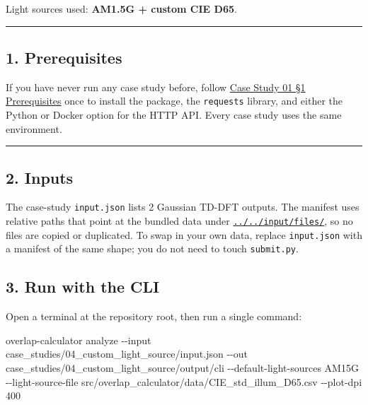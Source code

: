 \documentclass[
  11pt,
]{article}
\newenvironment{Shaded}{}{}
\newcommand{\AttributeTok}[1]{\textcolor[rgb]{0.49,0.56,0.16}{#1}}
\newcommand{\ExtensionTok}[1]{#1}
\newcommand{\NormalTok}[1]{#1}
\begin{document}
Light sources used: \textbf{AM1.5G + custom CIE D65}.

\begin{center}\rule{0.5\linewidth}{0.5pt}\end{center}

\hypertarget{1-prerequisites}{
\subsection{1. Prerequisites}\label{1-prerequisites}}

If you have never run any case study before, follow
\href{https://github.com/pinarsyt/overlap-calculator/blob/main/case_studies/01_theoretical_only/README.md\#1-prerequisites}{Case
Study 01 §1 Prerequisites} once to install the package, the
\texttt{requests} library, and either the Python or Docker option for
the HTTP API. Every case study uses the same environment.

\begin{center}\rule{0.5\linewidth}{0.5pt}\end{center}

\hypertarget{2-inputs}{
\subsection{2. Inputs}\label{2-inputs}}

The case-study \texttt{input.json} lists 2 Gaussian TD-DFT outputs. The
manifest uses relative paths that point at the bundled data under
\href{https://github.com/pinarsyt/overlap-calculator/blob/main/input/files}{\texttt{../../input/files/}},
so no files are copied or duplicated. To swap in your own data, replace
\texttt{input.json} with a manifest of the same shape; you do not need
to touch \texttt{submit.py}.

\hypertarget{3-run-with-the-cli}{
\subsection{3. Run with the CLI}\label{3-run-with-the-cli}}

Open a terminal at the repository root, then run a single command:

\begin{Shaded}
\begin{Highlighting}[]
\ExtensionTok{overlap{-}calculator}\NormalTok{ analyze }\AttributeTok{{-}{-}input}\NormalTok{ case\_studies/04\_custom\_light\_source/input.json }\AttributeTok{{-}{-}out}\NormalTok{ case\_studies/04\_custom\_light\_source/output/cli }\AttributeTok{{-}{-}default{-}light{-}sources}\NormalTok{ AM15G }\AttributeTok{{-}{-}light{-}source{-}file}\NormalTok{ src/overlap\_calculator/data/CIE\_std\_illum\_D65.csv }\AttributeTok{{-}{-}plot{-}dpi}\NormalTok{ 400}
\end{Highlighting}
\end{Shaded}
\end{document}
